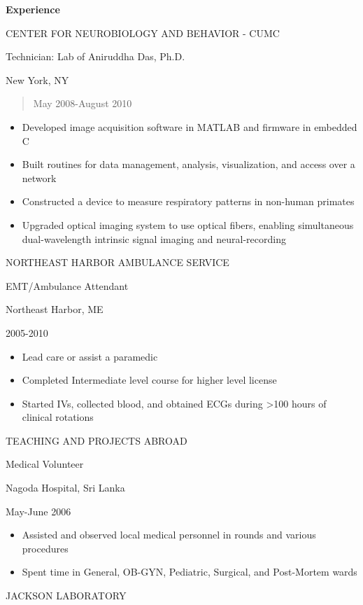 \textbf{Experience}

CENTER FOR NEUROBIOLOGY AND BEHAVIOR - CUMC

Technician: Lab of Aniruddha Das, Ph.D.

New York, NY

\begin{quote}
May 2008-August 2010
\end{quote}

\begin{itemize}
\item
  Developed image acquisition software in MATLAB and firmware in
  embedded C
\item
  Built routines for data management, analysis, visualization, and
  access over a network
\item
  Constructed a device to measure respiratory patterns in non-human
  primates
\item
  Upgraded optical imaging system to use optical fibers, enabling
  simultaneous dual-wavelength intrinsic signal imaging and
  neural-recording
\end{itemize}

NORTHEAST HARBOR AMBULANCE SERVICE

EMT/Ambulance Attendant

Northeast Harbor, ME

2005-2010

\begin{itemize}
\item
  Lead care or assist a paramedic
\item
  Completed Intermediate level course for higher level license
\item
  Started IVs, collected blood, and obtained ECGs during \textgreater100
  hours of clinical rotations
\end{itemize}

TEACHING AND PROJECTS ABROAD

Medical Volunteer

Nagoda Hospital, Sri Lanka

May-June 2006

\begin{itemize}
\item
  Assisted and observed local medical personnel in rounds and various
  procedures
\item
  Spent time in General, OB-GYN, Pediatric, Surgical, and Post-Mortem
  wards
\end{itemize}

JACKSON LABORATORY

